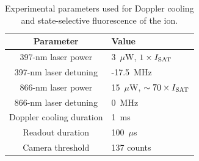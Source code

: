     \begin{table}
        \begin{center}
        \begin{tabular}{|c|l|}
            \hline
            Parameter & Value \\
            \hline
            397-nm laser power & 3~$\mu$W, $1\times I_{\rm SAT}$ \\
            397-nm laser detuning & -17.5~MHz\\
            866-nm laser power & 15~$\mu$W, $\sim 70\times I_{\rm SAT}$\\
            866-nm laser detuning & 0~MHz \\
            Doppler cooling duration & 1~ms\\
            Readout duration & 100~$\mu$s \\
            Camera threshold & 137 counts \\
            \hline
        \end{tabular}
        \end{center}
        \caption{
            Experimental parameters used for Doppler cooling and state-selective fluorescence of the ion. 
            }
        \label{tab:397_parameters}
    \end{table}


